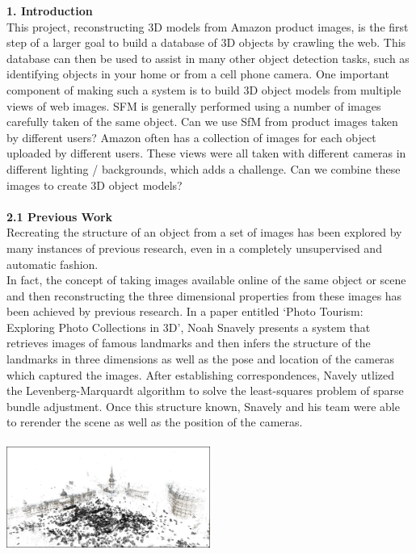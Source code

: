 \documentclass[12pt]{article}
\begin{document}
\begin{multicols}{2}
{\noindent \large \textbf{1. Introduction}}\\
This project, reconstructing 3D models from Amazon product images, is the first step of a larger goal to build a database of 3D objects by crawling the web.  This database can then be used to assist in many other object detection tasks, such as identifying objects in your home or from a cell phone camera.  One important component of making such a system is to build 3D object models from multiple views of web images. SFM is generally performed using a number of images carefully taken of the same object.  Can we use SfM from product images taken by different users?  Amazon often has a collection of images for each object uploaded by different users.  These views were all taken with different cameras in different lighting / backgrounds, which adds a challenge.  Can we combine these images to create 3D object models?
\\\\
{\large \textbf{2.1 Previous Work}}\\
Recreating the structure of an object from a set of images has been explored by many instances of previous research, even in a completely unsupervised and automatic fashion. \\
\indent In fact, the concept of taking images available online of the same object or scene and then reconstructing the three dimensional properties from these images has been achieved by previous research. In a paper entitled `Photo Tourism: Exploring Photo Collections in 3D', Noah Snavely presents a system that retrieves images of famous landmarks and then infers the structure of the landmarks in three dimensions as well as the pose and location of the cameras which captured the images. After establishing correspondences, Navely utlized the Levenberg-Marquardt algorithm to solve the least-squares problem of sparse bundle adjustment. Once this structure known, Snavely and his team were able to rerender the scene as well as the position of the cameras. \\\\
\includegraphics[width=0.5\textwidth]{images/phototourism.png}\\\\

\end{multicols}
\end{document}
